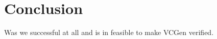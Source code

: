 \section{Conclusion}\label{sec:conclusion}
Was we successful at all and is in feasible to make VCGen verified.